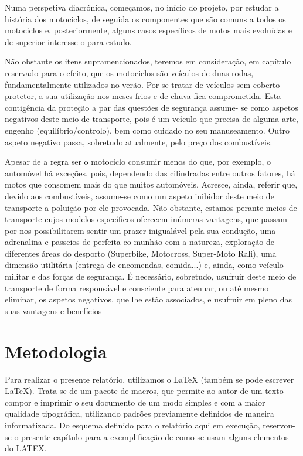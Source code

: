 \documentclass{report}
\begin{document}
Numa perspetiva diacrónica, começamos, no início do projeto, por estudar a história dos motociclos, de seguida os componentes que são comuns a todos os motociclos e, posteriormente, alguns casos específicos de motos mais evoluídas e de superior interesse o para estudo.

Não obstante os itens supramencionados, teremos em consideração, em capítulo reservado para o efeito, que os motociclos são veículos de duas rodas, fundamentalmente utilizados no verão. Por se tratar de veículos sem coberto protetor, a sua utilização nos meses frios e de chuva fica comprometida. Esta contigência da proteção a par das questões de segurança assume- se como aspetos negativos deste meio de transporte, pois é um veículo que precisa de alguma arte, engenho (equilíbrio/controlo), bem como cuidado no seu manuseamento. Outro aspeto negativo passa, sobretudo atualmente, pelo preço dos combustíveis.

Apesar de a regra ser o motociclo consumir menos do que, por exemplo, o automóvel há exceções, pois, dependendo das cilindradas entre outros fatores, há motos que consomem mais do que muitos automóveis. Acresce, ainda, referir que, devido aos combustíveis, assume-se como um aspeto inibidor deste meio de transporte a poluição por ele provocada. Não obstante, estamos perante meios de transporte cujos modelos específicos oferecem inúmeras vantagens, que passam por nos possibilitarem sentir um prazer inigualável pela sua condução, uma adrenalina e passeios de perfeita co munhão com a natureza, exploração de diferentes áreas do desporto (Superbike, Motocross, Super-Moto Rali), uma dimensão utilitária (entrega de encomendas, comida...) e, ainda, como veículo militar e das forças de segurança. É necessário, sobretudo, usufruir deste meio de transporte de forma responsável e consciente para atenuar, ou até mesmo eliminar, os aspetos negativos, que lhe estão associados, e usufruir em pleno das suas vantagens e benefícios

\chapter{Metodologia}
\label{chap.metodologia}
Para realizar o presente relatório, utilizamos o LaTeX (também se pode escrever LaTeX). Trata-se de um pacote de macros, que permite ao autor de um texto compor e imprimir o seu documento de um modo simples e com a maior qualidade tipográfica, utilizando padrões previamente definidos de maneira informatizada. Do esquema definido para o relatório aqui em execução, reservou-se o presente capítulo para a exemplificação de como se usam alguns elementos do LATEX.
\end{document}
